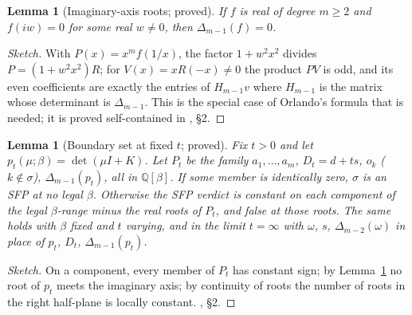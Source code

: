 \documentclass[11pt]{article}
\newtheorem{lemma}[theorem]{Lemma}
\theoremstyle{definition}
\newcommand{\Q}{\mathbb{Q}}
\begin{document}
\begin{lemma}[Imaginary-axis roots; proved]\label{lem:b3}
If $f$ is real of degree $m\ge2$ and $f(iw)=0$ for some real $w\neq0$, then $\Delta_{m-1}(f)=0$.
\end{lemma}
\begin{proof}[Sketch]
With $P(x)=x^mf(1/x)$, the factor $1+w^2x^2$ divides $P=(1+w^2x^2)R$; for $V(x)=xR(-x)\neq0$ the product $PV$ is odd,
and its even coefficients are exactly the entries of $H_{m-1}v$ where $H_{m-1}$ is the matrix whose determinant is
$\Delta_{m-1}$. This is the special case of Orlando's formula that is needed; it is proved self-contained in
, \S2.
\end{proof}

\begin{lemma}[Boundary set at fixed $t$; proved]\label{lem:B}
Fix $t>0$ and let $p_t(\mu;\beta)=\det(\mu I+K)$. Let $P_t$ be the family
$a_1,\dots,a_m$, $D_t=d+ts$, $o_k$ ($k\notin\sigma$), $\Delta_{m-1}(p_t)$, all in $\Q[\beta]$. If some member is
identically zero, $\sigma$ is an SFP at no legal $\beta$. Otherwise the SFP verdict is constant on each component of the
legal $\beta$-range minus the real roots of $P_t$, and false at those roots. The same holds with $\beta$ fixed and $t$
varying, and in the limit $t=\infty$ with $\omega$, $s$, $\Delta_{m-2}(\omega)$ in place of $p_t$, $D_t$,
$\Delta_{m-1}(p_t)$.
\end{lemma}
\begin{proof}[Sketch]
On a component, every member of $P_t$ has constant sign; by Lemma~\ref{lem:b3} no root of $p_t$ meets the imaginary
axis; by continuity of roots the number of roots in the right half-plane is locally constant. , \S2.
\end{proof}
\end{document}
